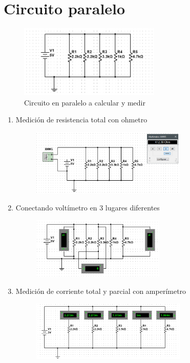 \documentclass[letterpaper,12pt]{article}
\begin{document}
\begin{sloppypar}
\section{Circuito paralelo}
\begin{figure}[H]
    \centering
    \includegraphics[width=0.6\textwidth]{images/proytec/cirp.png}
    \caption{Circuito en paralelo a calcular y medir}
\end{figure}
\begin{enumerate}
    \item Medición de resistencia total con ohmetro
    \begin{figure}[H]
        \centering
        \includegraphics[width=0.7\textwidth]{images/proytec/prt.PNG}
    \end{figure}
    \item Conectando voltímetro en 3 lugares diferentes 
    \begin{figure}[H]
        \centering
        \includegraphics[width=0.6\textwidth]{images/proytec/pvt.PNG}
    \end{figure}
    \item Medición de corriente total y parcial con amperímetro 
    \begin{figure}[H]
        \centering
        \includegraphics[width=0.7\textwidth]{images/proytec/pcp.PNG}

\end{figure}
\end{enumerate}
\end{sloppypar}
\end{document}
